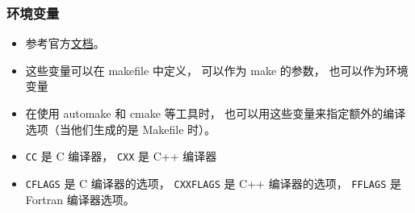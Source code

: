 \subsubsection{环境变量}
\begin{itemize}
\item 参考官方\href{https://www.gnu.org/software/make/manual/html_node/Implicit-Variables.html}{文档}。
\item 这些变量可以在 makefile 中定义， 可以作为 make 的参数， 也可以作为环境变量
\item 在使用 automake 和 cmake 等工具时， 也可以用这些变量来指定额外的编译选项（当他们生成的是 Makefile 时）。
\item \verb|CC| 是 C 编译器， \verb|CXX| 是 C++ 编译器
\item \verb|CFLAGS| 是 C 编译器的选项， \verb|CXXFLAGS| 是 C++ 编译器的选项， \verb|FFLAGS| 是 Fortran 编译器选项。
\end{itemize}
